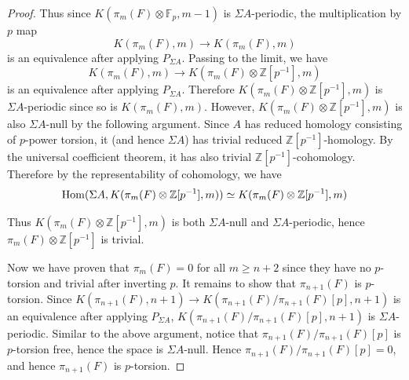 \begin{proof}
		Thus since $K(\pi_m(F)\otimes\mathbb{F}_p,m-1)$ is $\Sigma A$-periodic, the multiplication by $p$ map 
		\[ K(\pi_m(F),m)\to K(\pi_m(F),m) \] 
		is an equivalence after applying $P_{\Sigma A}$. Passing to the limit, we have 
		\[ K(\pi_m(F),m)\to K(\pi_m(F)\otimes\mathbb{Z}[p^{-1}],m) \] 
		is an equivalence after applying $P_{\Sigma A}$. Therefore $K(\pi_m(F)\otimes\mathbb{Z}[p^{-1}],m)$ is $\Sigma A$-periodic since so is $K(\pi_m(F),m)$. However, $K(\pi_m(F)\otimes\mathbb{Z}[p^{-1}],m)$ is also $\Sigma A$-null by the following argument. Since $A$ has reduced homology consisting of $p$-power torsion, it (and hence $\Sigma A$) has trivial reduced $\mathbb{Z}[p^{-1}]$-homology. By the universal coefficient theorem, it has also trivial $\mathbb{Z}[p^{-1}]$-cohomology. Therefore by the representability of cohomology, we have 
		\[ \operatorname{\mathrm{Hom}}(\Sigma A,K(\pi_m(F)\otimes\mathbb{Z}[p^{-1}],m))\simeq K(\pi_m(F)\otimes\mathbb{Z}[p^{-1}],m) \]

		Thus $K(\pi_m(F)\otimes\mathbb{Z}[p^{-1}],m)$ is both $\Sigma A$-null and $\Sigma A$-periodic, hence $\pi_m(F)\otimes\mathbb{Z}[p^{-1}]$ is trivial. 

		Now we have proven that $\pi_m(F)=0$ for all $m\geq n+2$ since they have no $p$-torsion and trivial after inverting $p$. It remains to show that $\pi_{n+1}(F)$ is $p$-torsion. Since $K(\pi_{n+1}(F),n+1)\to K(\pi_{n+1}(F)/\pi_{n+1}(F)[p],n+1)$ is an equivalence after applying $P_{\Sigma A}$, $K(\pi_{n+1}(F)/\pi_{n+1}(F)[p],n+1)$ is $\Sigma A$-periodic. Similar to the above argument, notice that $\pi_{n+1}(F)/\pi_{n+1}(F)[p]$ is $p$-torsion free, hence the space is $\Sigma A$-null. Hence $\pi_{n+1}(F)/\pi_{n+1}(F)[p]=0$, and hence $\pi_{n+1}(F)$ is $p$-torsion. 
	\end{proof}

